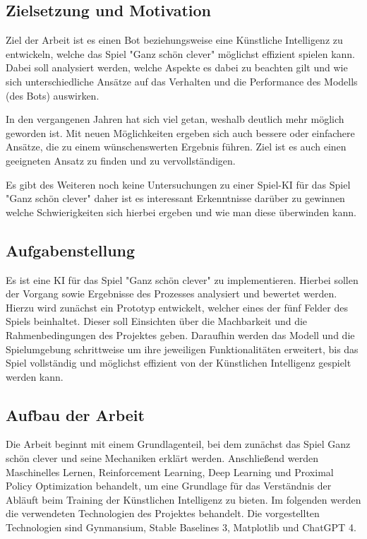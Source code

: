 \subsection{Zielsetzung und Motivation}
Ziel der Arbeit ist es einen Bot beziehungsweise eine Künstliche Intelligenz zu entwickeln, welche das Spiel "Ganz schön clever" möglichst effizient spielen kann. Dabei soll analysiert werden, welche Aspekte es dabei zu beachten gilt und wie sich unterschiedliche Ansätze auf das Verhalten und die Performance des Modells (des Bots) auswirken.

In den vergangenen Jahren hat sich viel getan, weshalb deutlich mehr möglich geworden ist. Mit neuen Möglichkeiten ergeben sich auch bessere oder einfachere Ansätze, die zu einem wünschenswerten Ergebnis führen. Ziel ist es auch einen geeigneten Ansatz zu finden und zu vervollständigen.

Es gibt des Weiteren noch keine Untersuchungen zu einer Spiel-KI für das Spiel "Ganz schön clever" daher ist es interessant Erkenntnisse darüber zu gewinnen welche Schwierigkeiten sich hierbei ergeben und wie man diese überwinden kann.
\subsection{Aufgabenstellung}
Es ist eine KI für das Spiel "Ganz schön clever" zu implementieren. Hierbei sollen der Vorgang sowie Ergebnisse des Prozesses analysiert und bewertet werden. Hierzu wird zunächst ein Prototyp entwickelt, welcher eines der fünf Felder des Spiels beinhaltet. Dieser soll Einsichten über die Machbarkeit und die Rahmenbedingungen des Projektes geben. Daraufhin werden das Modell und die Spielumgebung schrittweise um ihre jeweiligen Funktionalitäten erweitert, bis das Spiel vollständig und möglichst effizient von der Künstlichen Intelligenz gespielt werden kann.
\subsection{Aufbau der Arbeit}
Die Arbeit beginnt mit einem Grundlagenteil, bei dem zunächst das Spiel Ganz schön clever und seine Mechaniken erklärt werden. Anschließend werden Maschinelles Lernen, Reinforcement Learning, Deep Learning und Proximal Policy Optimization behandelt, um eine Grundlage für das Verständnis der Abläuft beim Training der Künstlichen Intelligenz zu bieten. Im folgenden werden die verwendeten Technologien des Projektes behandelt. Die vorgestellten Technologien sind Gynmansium, Stable Baselines 3, Matplotlib und ChatGPT 4.

